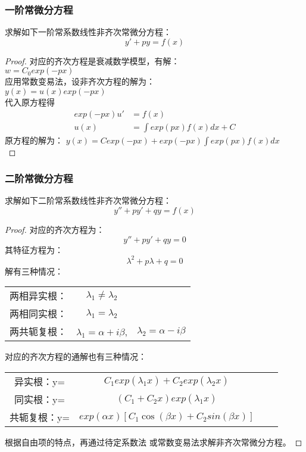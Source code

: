 \subsubsection{一阶常微分方程}
\begin{example} %
	求解如下一阶常系数线性非齐次常微分方程：
	\begin{equation*}
	 y'+py=f(x)
	\end{equation*}
	\begin{proof} 
		对应的齐次方程是衰减数学模型，有解：\\
		$w=C_0 exp(-px)$ \\
		应用常数变易法，设非齐次方程的解为：\\
		$ y(x) =u(x) exp(-px)$ \\
		代入原方程得
		\begin{align*}
		exp(−px)u′ &= f(x)\\
		u(x) &= \int exp(px) f (x)dx + C
		\end{align*}
		原方程的解为： $ y(x)=C exp(-px)+exp(-px) \int exp(px)f(x)dx $ \\
	\end{proof}
\end{example}

\subsubsection{二阶常微分方程}
\begin{example} %
	求解如下二阶常系数线性非齐次常微分方程：
	\begin{equation*}
		y''+py'+qy=f(x)
	\end{equation*}
	\begin{proof} 
	对应的齐次方程为：
	\begin{equation*}
	y''+py'+qy=0
   \end{equation*}
	其特征方程为：
 \begin{equation*}
	\lambda^2 +p\lambda +q=0
  \end{equation*}
  解有三种情况：
  \begin{table} [H]
\begin{tabular}{ccc}
	两相异实根：& $\lambda_1 \ne \lambda_2 $ & \\
	两相同实根：& $\lambda_1 = \lambda_2 $  &\\
	两共轭复根：& $\lambda_1=\alpha+i\beta $, & $\lambda_2=\alpha-i\beta$\\ 
\end{tabular}
 \end{table}
对应的齐次方程的通解也有三种情况：
  \begin{table} [H]
	\begin{tabular}{cccc}
		异实根：y=& $C_1 exp(\lambda_1 x)+ C_2 exp (\lambda_2 x) $ & \\
		同实根：y=&$(C_1+C_2x)  exp (\lambda_1 x) $  &\\
		共轭复根：y=& $ exp(\alpha x)  [C_1 \cos (\beta x)+ C_2 sin (\beta x)] $\\ 
	\end{tabular}
\end{table}
根据自由项的特点，再通过待定系数法 或常数变易法求解非齐次常微分方程。
	\end{proof}
\end{example}

